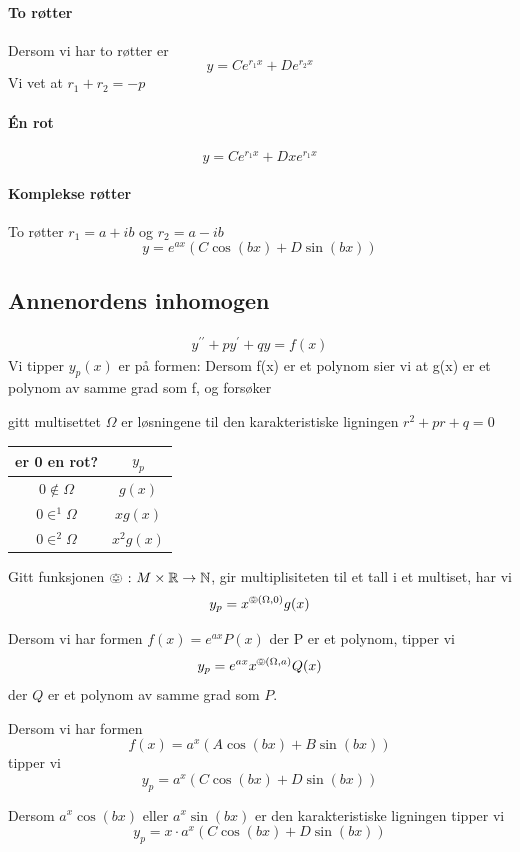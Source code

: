 \documentclass[defaultpackages]{cheatsheet}
\begin{document}
	\paragraph{To røtter}
	Dersom vi har to røtter er
	\[y = Ce^{r_1x} + De^{r_2x}\]
	Vi vet at $r_1+r_2=-p$
	\paragraph{\'En rot}
	\[y=Ce^{r_1x}+Dxe^{r_1x}\]
	\paragraph{Komplekse røtter}
	To røtter $r_1=a+ib$ og $r_2 = a-ib$
	\[y=e^{ax}(C\cos(bx)+D\sin (bx))\]

\subsection{Annenordens inhomogen}
\begin{align*}
	y^{\prime\prime} + py^\prime + qy = f(x)
\end{align*}
Vi tipper $y_p(x)$ er på formen:
Dersom f(x) er et polynom sier vi at g(x) er et polynom av samme grad som f, og forsøker

gitt multisettet $\Omega$ er løsningene til den karakteristiske ligningen $r^2 + pr + q = 0$
\begin{tabular}{|c|c|}
	\hline
	er 0 en rot?& $y_p$\\\hline
	$0 \notin \Omega$ & $g(x)$\\
	$0 \in^1 \Omega$ & $xg(x)$\\
	$0 \in^2 \Omega$ & $x^2g(x)$\\
	\hline
\end{tabular}

Gitt funksjonen $\pumpkin\; \colon M \times \mathbb{R} \to \mathbb{N}$, gir multiplisiteten til et tall i et multiset, har vi
\[y_p = x^{\pumpkin(\Omega, 0)}g(x)\]

Dersom vi har formen $f(x) = e^{ax}P(x)$ der P er et polynom, tipper vi
\[y_p = e^{ax}x^{\pumpkin(\Omega, a)}Q(x)\]
der $Q$ er et polynom av samme grad som $P$.

Dersom vi har formen $$f(x) = a^x(A\cos (bx) + B\sin (bx))$$ tipper vi
\[y_p = a^x(C\cos(bx) + D\sin(bx))\]

Dersom $a^x\cos(bx)$ eller $a^x\sin(bx)$ er den karakteristiske ligningen tipper vi
\[y_p = x\cdot a^x(C\cos (bx) + D\sin (bx))\]
\end{document}
